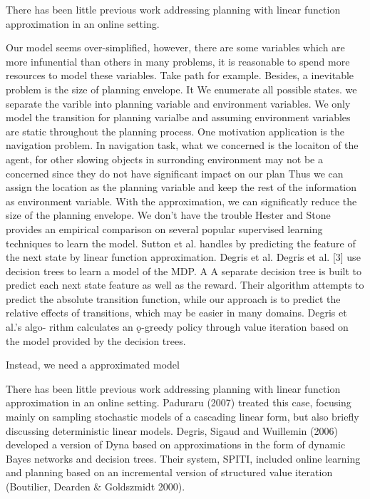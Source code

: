 \documentclass{article} %
\begin{document}
There has been little previous work addressing planning
with linear function approximation in an online setting.

Our model seems over-simplified, however, there are some variables which are more 
infunential than others in many problems, it is reasonable to spend more resources
to model these variables. Take path for example.
Besides, a inevitable problem is the size of planning envelope. It 
We enumerate all possible states.
we separate the varible into planning variable and environment variables.
We only model the transition for planning varialbe and assuming environment variables are
static throughout the planning process.
One motivation application is the navigation problem. In navigation task,
what we concerned is the locaiton of the agent, 
for other slowing objects in surronding environment may not be a concerned 
since they do not have significant impact on our plan
Thus we can assign the location
as the planning variable and keep the rest of the information as environment variable.
With the approximation, we can significatly reduce the size of the planning envelope.
We don't have the trouble 
Hester and Stone provides an empirical comparison on several popular 
supervised learning techniques to learn the model.
Sutton et al. handles by predicting the feature of the next state by linear function approximation.
Degris et al. 
Degris et al. [3] use decision trees to learn a model of
the MDP. A
A separate decision tree is built to predict each
next state feature as well as the reward. Their algorithm
attempts to predict the absolute transition function, while
our approach is to predict the relative effects of transitions,
which may be easier in many domains. Degris et al.’s algo-
rithm calculates an ǫ-greedy policy through value iteration
based on the model provided by the decision trees.




Instead, we need a approximated model

There has been little previous work addressing planning
with linear function approximation in an online setting.
Paduraru (2007) treated this case, focusing mainly on sampling
stochastic models of a cascading linear form, but
also briefly discussing deterministic linear models. Degris,
Sigaud and Wuillemin (2006) developed a version of Dyna
based on approximations in the form of dynamic Bayes networks
and decision trees. Their system, SPITI, included
online learning and planning based on an incremental version
of structured value iteration (Boutilier, Dearden &
Goldszmidt 2000).
\end{document}
